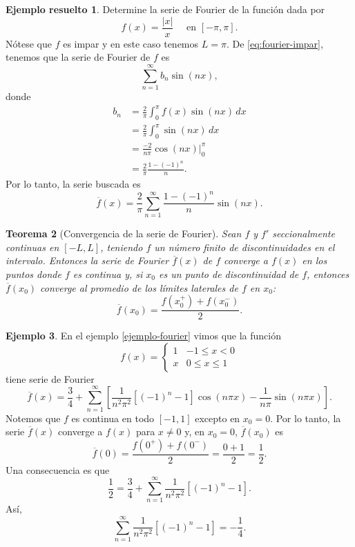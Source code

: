 \documentclass[11pt,letterpaper,draft]{report}
\theoremstyle{plain}
\newtheorem{theorem}{Teorema}[chapter]
\theoremstyle{definition}
\newtheorem{example}[theorem]{Ejemplo}
\newtheorem{solved}[theorem]{Ejemplo resuelto}
\theoremstyle{remark}
\newcommand\<{\langle}
\renewcommand\>{\rangle}
\begin{document}
\begin{solved}
  Determine la serie de Fourier de la función dada por
  \[
    f(x) = \frac{|x|}{x} \quad \text{ en } [-\pi,\pi]
  .\]
  Nótese que $f$ es impar y en este caso tenemos $L=\pi$.
  De \eqref{eq:fourier-impar},
  tenemos que la serie de Fourier de $f$ es
  \[
    \sum_{n=1}^{\infty}b_n\sin(nx)
  ,\]
  donde
  \begin{align*}
    b_n
    &= \frac{2}{\pi}\int_{0}^{\pi}f(x)\sin(nx)\,dx \\
    &= \frac{2}{\pi}\int_{0}^{\pi}\sin(nx)\,dx \\
    &= \frac{-2}{n\pi}\cos(nx)\Big|_{0}^{\pi} \\
    &= \frac{2}{\pi}\frac{1-(-1)^{n}}{n}.
  \end{align*}
  Por lo tanto, la serie buscada es
  \[
    \overline{f}(x)
    =
    \frac{2}{\pi}\sum_{n=1}^{\infty}\frac{1-(-1)^{n}}{n}\sin(nx)
  .\]
  
\end{solved}

\begin{theorem}[Convergencia de la serie de Fourier]
  Sean $f$ y $f'$ seccionalmente continuas en $[-L,L]$, teniendo $f$
  un número finito de discontinuidades en el intervalo. Entonces la
  serie de Fourier $\overline{f}(x)$ de $f$ converge a $f(x)$ en los
  puntos donde $f$ es continua y, si $x_0$ es un punto de
  discontinuidad de $f$, entonces $\overline{f}(x_0)$ converge al
  promedio de los límites laterales de $f$ en $x_0$:
  \[
    \overline{f}(x_0) = \frac{f(x_0^{+})+f(x_0^{-})}{2}
  .\]
\end{theorem}

\begin{example}
  En el ejemplo \ref{ejemplo-fourier} vimos que la función
  \[
    f(x) =
    \begin{cases}
      1 & -1\leq x<0 \\
      x & 0\leq x\leq 1
    \end{cases}
  \]
  tiene serie de Fourier
  \[
    \overline{f}(x)
    =
    \frac{3}{4}
    +
    \sum_{n=1}^{\infty}
    \left[
      \frac{1}{n^{2}\pi^{2}}[(-1)^{n}-1]\cos(n\pi x)
      -\frac{1}{n\pi}\sin(n\pi x)
    \right]
  .\]
  Notemos que $f$ es continua en todo $[-1,1]$ excepto en $x_0=0$.
  Por lo tanto, la serie $\overline{f}(x)$ converge a $f(x)$ para
  $x\neq 0$ y, en $x_0=0$, $\overline{f}(x_0)$ es
  \[
    \overline{f}(0)
    =\frac{f(0^{+})+f(0^{-})}{2}
    = \frac{0+1}{2}
    =\frac{1}{2}
  .\]
  Una consecuencia es que
  \[
    \frac{1}{2} = \frac{3}{4} + 
    \sum_{n=1}^{\infty}
      \frac{1}{n^{2}\pi^{2}}[(-1)^{n}-1]
  .\]
  Así,
  \[
    \sum_{n=1}^{\infty}
      \frac{1}{n^{2}\pi^{2}}[(-1)^{n}-1]
    =
    - \frac{1}{4}
  .\]
\end{example}
\end{document}
